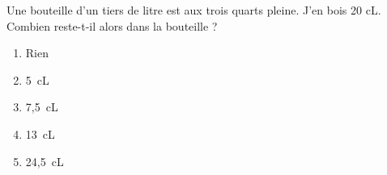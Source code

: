Une bouteille d'un tiers de litre est aux trois quarts pleine. J'en
bois 20 cL.  Combien reste-t-il alors dans la bouteille ?
\begin{multicols}{5}
  \begin{enumerate}[A/]
  \item Rien
  \item 5~cL
  \item 7,5~cL
  \item 13~cL
  \item 24,5~cL
  \end{enumerate}
\end{multicols}